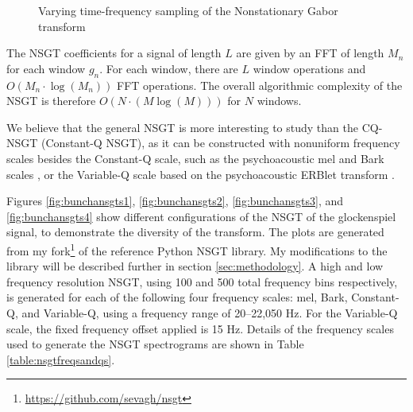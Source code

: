 \documentclass[report.tex]{subfiles}
\begin{document}
\begin{figure}[ht]
	\centering
	\hspace{1em}
	\caption{Varying time-frequency sampling of the Nonstationary Gabor transform \parencite[1,485, 1,487]{balazs}}
	\label{fig:nonuniformtflattices}
\end{figure}

The NSGT coefficients for a signal of length $L$ are given by an FFT of length $M_{n}$ for each window $g_{n}$. For each window, there are $L$ window operations and $O(M_{n} \cdot \log(M_{n}))$ FFT operations. The overall algorithmic complexity of the NSGT is therefore $O(N \cdot (M \log(M)))$ for $N$ windows.

We believe that the general NSGT is more interesting to study than the CQ-NSGT (Constant-Q NSGT), as it can be constructed with nonuniform frequency scales besides the Constant-Q scale, such as the psychoacoustic mel and Bark scales \parencite{melbook}, or the Variable-Q scale based on the psychoacoustic ERBlet transform \parencite{variableq1, variableq2}.

Figures \ref{fig:bunchansgts1}, \ref{fig:bunchansgts2}, \ref{fig:bunchansgts3}, and \ref{fig:bunchansgts4} show different configurations of the NSGT of the glockenspiel signal, to demonstrate the diversity of the transform. The plots are generated from my fork\footnote{\url{https://github.com/sevagh/nsgt}} of the reference Python NSGT library. My modifications to the library will be described further in section \ref{sec:methodology}. A high and low frequency resolution NSGT, using 100 and 500 total frequency bins respectively, is generated for each of the following four frequency scales: mel, Bark, Constant-Q, and Variable-Q, using a frequency range of 20--22,050 Hz. For the Variable-Q scale, the fixed frequency offset applied is 15 Hz.  Details of the frequency scales used to generate the NSGT spectrograms are shown in Table \ref{table:nsgtfreqsandqs}.
\end{document}
